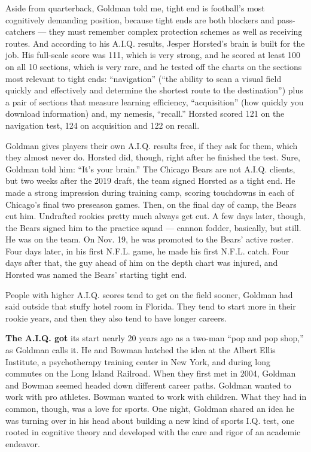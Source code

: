 Aside from quarterback, Goldman told me, tight end is football's most
cognitively demanding position, because tight ends are both blockers and
pass-catchers --- they must remember complex protection schemes as well
as receiving routes. And according to his A.I.Q. results, Jesper
Horsted's brain is built for the job. His full-scale score was 111,
which is very strong, and he scored at least 100 on all 10 sections,
which is very rare, and he tested off the charts on the sections most
relevant to tight ends: ``navigation'' (``the ability to scan a visual
field quickly and effectively and determine the shortest route to the
destination'') plus a pair of sections that measure learning efficiency,
``acquisition'' (how quickly you download information) and, my nemesis,
``recall.'' Horsted scored 121 on the navigation test, 124 on
acquisition and 122 on recall.

Goldman gives players their own A.I.Q. results free, if they ask for
them, which they almost never do. Horsted did, though, right after he
finished the test. Sure, Goldman told him: ``It's your brain.'' The
Chicago Bears are not A.I.Q. clients, but two weeks after the 2019
draft, the team signed Horsted as a tight end. He made a strong
impression during training camp, scoring touchdowns in each of Chicago's
final two preseason games. Then, on the final day of camp, the Bears cut
him. Undrafted rookies pretty much always get cut. A few days later,
though, the Bears signed him to the practice squad --- cannon fodder,
basically, but still. He was on the team. On Nov. 19, he was promoted to
the Bears' active roster. Four days later, in his first N.F.L. game, he
made his first N.F.L. catch. Four days after that, the guy ahead of him
on the depth chart was injured, and Horsted was named the Bears'
starting tight end.

People with higher A.I.Q. scores tend to get on the field sooner,
Goldman had said outside that stuffy hotel room in Florida. They tend to
start more in their rookie years, and then they also tend to have longer
careers.

\textbf{The A.I.Q. got} its start nearly 20 years ago as a two-man ``pop
and pop shop,'' as Goldman calls it. He and Bowman hatched the idea at
the Albert Ellis Institute, a psychotherapy training center in New York,
and during long commutes on the Long Island Railroad. When they first
met in 2004, Goldman and Bowman seemed headed down different career
paths. Goldman wanted to work with pro athletes. Bowman wanted to work
with children. What they had in common, though, was a love for sports.
One night, Goldman shared an idea he was turning over in his head about
building a new kind of sports I.Q. test, one rooted in cognitive theory
and developed with the care and rigor of an academic endeavor.

